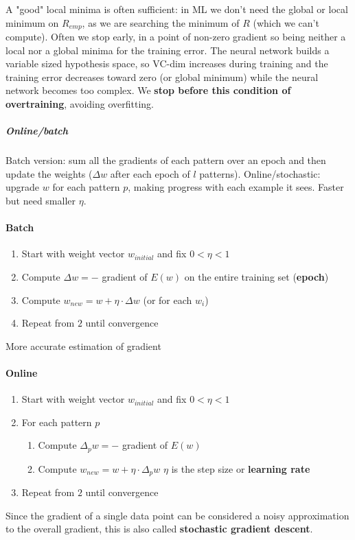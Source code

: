 \documentclass[10pt]{report}
\begin{document}
A "good" local minima is often sufficient: in ML we don't need the global or local minimum on $R_{emp}$, as we are searching the minimum of $R$ (which we can't compute). Often we stop early, in a point of non-zero gradient so being neither a local nor a global minima for the training error. The neural network builds a variable sized hypothesis space, so VC-dim increases during training and the training error decreases toward zero (or global minimum) while the neural network becomes too complex. We \textbf{stop before this condition of overtraining}, avoiding overfitting.
\subparagraph{Online/batch} Batch version: sum all the gradients of each pattern over an epoch and then update the weights ($\Delta w$ after each epoch of $l$ patterns). Online/stochastic: upgrade $w$ for each pattern $p$, making progress with each example it sees. Faster but need smaller $\eta$.\begin{multicols}{2}
\paragraph{Batch}
\begin{enumerate}
	\item Start with weight vector $w_{initial}$ and fix $0 < \eta < 1$
	\item Compute $\Delta w = -$ gradient of $E(w)$ on the entire training set (\textbf{epoch})
	\item Compute $w_{new} = w + \eta\cdot\Delta w$ (or for each $w_i$)
	\item Repeat from $2$ until convergence
\end{enumerate}
More accurate estimation of gradient
\columnbreak
\paragraph{Online}
\begin{enumerate}
	\item Start with weight vector $w_{initial}$ and fix $0 < \eta < 1$
	\item For each pattern $p$\begin{enumerate}
		\item Compute $\Delta_p w = -$ gradient of $E(w)$
		\item Compute $w_{new} = w + \eta\cdot\Delta_p w$
	$\eta$ is the step size or \textbf{learning rate}
	\end{enumerate}
	\item Repeat from $2$ until convergence
\end{enumerate}
Since the gradient of a single data point can be considered a noisy approximation to the overall gradient, this is also called \textbf{stochastic gradient descent}.
\end{multicols}
\end{document}

